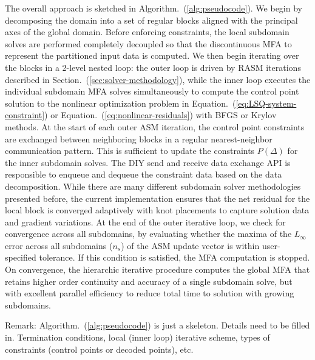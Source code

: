 \documentclass[conference]{IEEEtran}
\newcommand{\Remark}[1]{{\color{RED}\sf Remark: {#1}}}
\newcommand{\eqt}[1]{Equation.~(\ref{#1})}
\newcommand{\sect}[1]{Section.~(\ref{#1})}
\newcommand{\algo}[1]{Algorithm.~(\ref{#1})}
\begin{document}
The overall approach is sketched in \algo{alg:pseudocode}.
We begin by decomposing the domain into a set of regular blocks aligned with the principal axes
of the global domain. Before enforcing constraints, the local subdomain solves are performed completely decoupled so that the discontinuous MFA to represent the partitioned input data is computed. We then begin iterating over the blocks in a 2-level nested loop: the outer loop is driven by RASM
iterations described in \sect{sec:solver-methodology}, while the inner loop executes the individual subdomain MFA solves simultaneously to compute the control point solution to the nonlinear optimization problem in \eqt{eq:LSQ-system-constraint} or \eqt{eq:nonlinear-residuals}
with BFGS or Krylov methods. 
At the start of each outer ASM iteration, the control point constraints are exchanged between neighboring blocks in a regular nearest-neighbor communication pattern. This is sufficient to update the constraints $P(\Delta)$ for the inner subdomain solves. The DIY send and receive data exchange API is responsible to enqueue and dequeue the constraint data based on the data decomposition.
While there are many different subdomain solver methodologies presented before, the current implementation ensures that the net residual for the local block is converged adaptively with knot placements to capture solution data and gradient variations.
At the end of the outer iterative loop, we check for convergence across all subdomains, by evaluating whether the maxima of the $L_{\infty}$ error across all subdomains ($n_s$) of the ASM update vector is within user-specified tolerance. If this condition is satisfied, the MFA computation is stopped.
On convergence, the hierarchic iterative procedure computes the global MFA that retains higher order continuity and accuracy of a single subdomain solve, but with excellent parallel efficiency to reduce total time to solution with growing subdomains.


\Remark{\algo{alg:pseudocode} is just a skeleton. Details need to be filled in. Termination conditions, local
(inner loop) iterative scheme, types of constraints (control points or decoded points), etc.}
\end{document}
